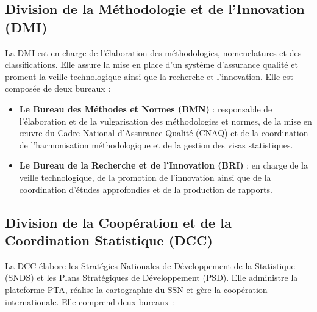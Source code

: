 \subsection{Division de la Méthodologie et de l’Innovation (DMI)}

La DMI est en charge de l’élaboration des méthodologies, nomenclatures et des classifications. 
Elle assure la mise en place d’un système d’assurance qualité et promeut la veille technologique 
ainsi que la recherche et l’innovation. Elle est composée de deux bureaux :


\begin{simplebox}
\begin{itemize}
    \item \textbf{Le Bureau des Méthodes et Normes (BMN)} : responsable de l’élaboration et 
    de la vulgarisation des méthodologies et normes, de la mise en œuvre du Cadre National 
    d’Assurance Qualité (CNAQ) et de la coordination de l’harmonisation méthodologique et 
    de la gestion des visas statistiques.
    \item \textbf{Le Bureau de la Recherche et de l’Innovation (BRI)} : en charge de la veille 
    technologique, de la promotion de l’innovation ainsi que de la coordination d’études 
    approfondies et de la production de rapports.
\end{itemize}
\end{simplebox}

\subsection{Division de la Coopération et de la Coordination Statistique (DCC)}

    
La DCC élabore les Stratégies Nationales de Développement de la Statistique (SNDS) et 
les Plans Stratégiques de Développement (PSD). Elle administre la plateforme PTA, réalise 
la cartographie du SSN et gère la coopération internationale. Elle comprend deux bureaux :

